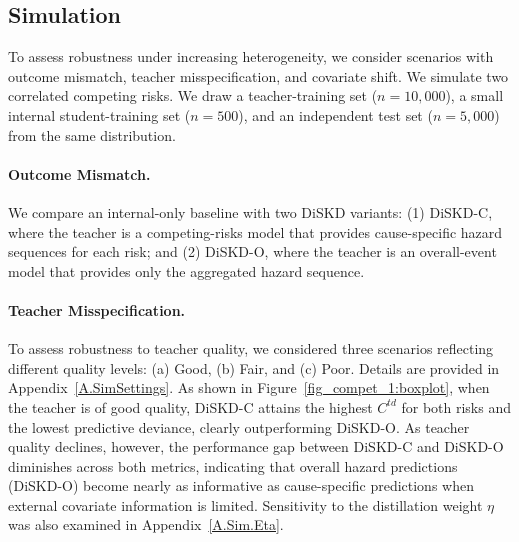 \documentclass{article}
\theoremstyle{plain}
\theoremstyle{definition}
\theoremstyle{remark}
\begin{document}
\subsection{Simulation}


To assess robustness under increasing heterogeneity, we consider scenarios with outcome mismatch, teacher misspecification, and covariate shift.  We simulate two correlated competing risks.
We draw a teacher-training set ($n=10{,}000$), a small internal student-training set ($n=500$), and an independent test set ($n=5{,}000$) from the same distribution. %


\paragraph{Outcome Mismatch.}
\label{Sim.data}
We compare an internal-only baseline with two DiSKD variants: (1) DiSKD-C, where the teacher is a competing-risks model that provides cause-specific hazard sequences for each risk; and (2) DiSKD-O, where the teacher is an overall-event model that provides only the aggregated hazard sequence. 


\paragraph{Teacher Misspecification.}
To assess robustness to teacher quality, we considered three scenarios reflecting different quality levels: (a) Good, (b) Fair, and (c) Poor. Details are provided in Appendix~\ref{A.SimSettings}. 
As shown in Figure~\ref{fig_compet_1:boxplot}, when the teacher is of good quality, DiSKD-C attains the highest $C^{td}$ for both risks and the lowest predictive deviance, clearly outperforming DiSKD-O. As teacher quality declines, however, the performance gap between DiSKD-C and DiSKD-O diminishes across both metrics, indicating that overall hazard predictions (DiSKD-O) become nearly as informative as cause-specific predictions when external covariate information is limited. Sensitivity to the distillation weight $\eta$ was also examined in Appendix~\ref{A.Sim.Eta}.
\end{document}
